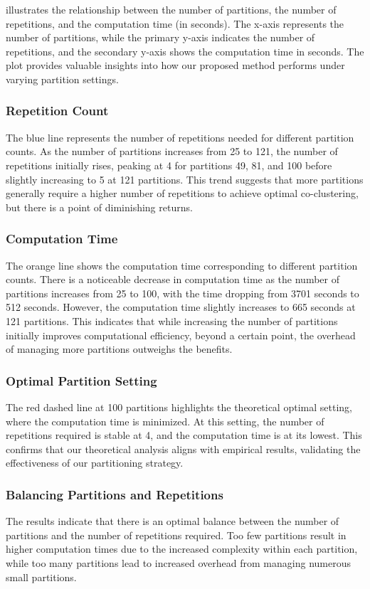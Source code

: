 \documentclass[journal]{IEEEtran}
\begin{document}
 illustrates the relationship between the number of partitions, the number of repetitions, and the computation time (in seconds). The x-axis represents the number of partitions, while the primary y-axis indicates the number of repetitions, and the secondary y-axis shows the computation time in seconds. The plot provides valuable insights into how our proposed method performs under varying partition settings.

\subsubsection{Repetition Count}
The blue line represents the number of repetitions needed for different partition counts. As the number of partitions increases from 25 to 121, the number of repetitions initially rises, peaking at 4 for partitions 49, 81, and 100 before slightly increasing to 5 at 121 partitions. This trend suggests that more partitions generally require a higher number of repetitions to achieve optimal co-clustering, but there is a point of diminishing returns.

\subsubsection{Computation Time}
The orange line shows the computation time corresponding to different partition counts. There is a noticeable decrease in computation time as the number of partitions increases from 25 to 100, with the time dropping from 3701 seconds to 512 seconds. However, the computation time slightly increases to 665 seconds at 121 partitions. This indicates that while increasing the number of partitions initially improves computational efficiency, beyond a certain point, the overhead of managing more partitions outweighs the benefits.

\subsubsection{Optimal Partition Setting}
The red dashed line at 100 partitions highlights the theoretical optimal setting, where the computation time is minimized. At this setting, the number of repetitions required is stable at 4, and the computation time is at its lowest. This confirms that our theoretical analysis aligns with empirical results, validating the effectiveness of our partitioning strategy.

\subsubsection{Balancing Partitions and Repetitions}
The results indicate that there is an optimal balance between the number of partitions and the number of repetitions required. Too few partitions result in higher computation times due to the increased complexity within each partition, while too many partitions lead to increased overhead from managing numerous small partitions.
\end{document}
